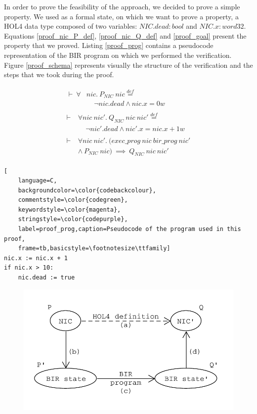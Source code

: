 \documentclass[10pt,a4paper]{article}
\newcommand{\eqdef}{\stackrel{def}{=}}
\begin{document}
\begin{multicols}{2}
In order to prove the feasibility of the approach, we decided to prove a simple property. We used as a formal state, on which we want to prove a property, a HOL4 data type composed of two variables: $NIC.dead:bool$ and $NIC.x:word32$. Equations \ref{proof_nic_P_def}, \ref{proof_nic_Q_def} and \ref{proof_goal} present the property that we proved. Listing \ref{proof_prog} contains a pseudocode representation of the BIR program on which we performed the verification. Figure \ref{proof_schema} represents visually the structure of the verification and the steps that we took during the proof.
%
\begin{small}
\begin{align}
  \begin{split}
    \label{proof_nic_P_def}
    \vdash~\forall &nic.~P_{NIC}~nic \eqdef\\
      &~~~~~\neg nic.dead \land nic.x = 0w
  \end{split}\\
  \begin{split}
    \label{proof_nic_Q_def}
    \vdash~&\forall nic~nic'.~Q_{NIC}~nic~nic' \eqdef\\
      &~~~~~\neg nic'.dead \land nic'.x = nic.x + 1w
  \end{split}\\
  \begin{split}
    \label{proof_goal}
    \vdash~&\forall nic~nic'.~(exec\_prog~nic~bir\_prog~nic'\\
      &\land~P_{NIC}~nic)~\implies~Q_{NIC}~nic~nic'
  \end{split}
\end{align}
\end{small}
%
\begin{lstlisting}[
    language=C,
    backgroundcolor=\color{codebackcolour},
    commentstyle=\color{codegreen},
    keywordstyle=\color{magenta},
    stringstyle=\color{codepurple},
    label=proof_prog,caption=Pseudocode of the program used in this proof,
    frame=tb,basicstyle=\footnotesize\ttfamily]
nic.x := nic.x + 1
if nic.x > 10:
    nic.dead := true
\end{lstlisting}
%
\begin{figure}[H]
	\includegraphics[width=\columnwidth]{figures/proof_schema.png}

\end{figure}
\end{multicols}
\end{document}
